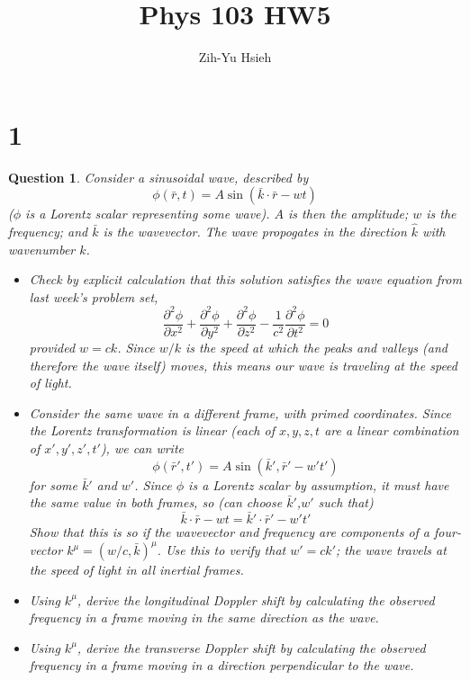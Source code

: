 \documentclass{article}
\title{Phys 103 HW5}
\author{Zih-Yu Hsieh}
\newtheorem{question}{Question}
\begin{document}
\maketitle

\section*{1}
\begin{question}\label{q1}
    Consider a sinusoidal wave, described by 
    $$\phi(\bar{r},t)=A\sin(\bar{k}\cdot \bar{r}-wt)$$
    ($\phi$ is a Lorentz scalar representing some wave). $A$ is then the amplitude; $w$ is the frequency; and $\bar{k}$ is the wavevector. The wave propogates in the direction $\hat{k}$ with wavenumber $k$.
    \begin{itemize}
        \item[(a)] Check by explicit calculation that this solution satisfies the wave equation from last week's problem set, 
        $$\frac{\partial^2\phi}{\partial x^2}+\frac{\partial^2\phi}{\partial y^2}+\frac{\partial^2\phi}{\partial z^2}-\frac{1}{c^2}\frac{\partial^2\phi}{\partial t^2} = 0$$
        provided $w=ck$. Since $w/k$ is the speed at which the peaks and valleys (and therefore the wave itself) moves, this means our wave is traveling at the speed of light.
        \item[(b)] Consider the same wave in a different frame, with primed coordinates. Since the Lorentz transformation is linear (each of $x,y,z,t$ are a linear combination of $x',y',z',t'$), we can write 
        $$\phi(\bar{r}',t')=A\sin(\bar{k}',\bar{r}'-w't')$$
        for some $\bar{k}'$ and $w'$. Since $\phi$ is a Lorentz scalar by assumption, it must have the same value in both frames, so (can choose $\bar{k}'$,$w'$ such that)
        $$\bar{k}\cdot \bar{r}-wt=\bar{k}'\cdot \bar{r}'-w't'$$
        Show that this is so if the wavevector and frequency are components of a four-vector $k^\mu=(w/c,\bar{k})^\mu$. Use this to verify that $w'=ck'$; the wave travels at the speed of light in all inertial frames.
        \item[(c)] Using $k^\mu$, derive the longitudinal Doppler shift by calculating the observed frequency in a frame moving in the same direction as the wave.
        \item[(d)] Using $k^\mu$, derive the transverse Doppler shift by calculating the observed frequency in a frame moving in a direction perpendicular to the wave. 
    \end{itemize}
\end{question}
\end{document}
